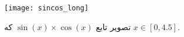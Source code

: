 \begin{figure}[!h]
\centerline{\texttt{[image: sincos\_long]}}
\caption{تصویر تابع $\sin(x)\times\cos(x)$ که $x\in[0,4.5]$.}
\label{fig:1:sin}
\end{figure}